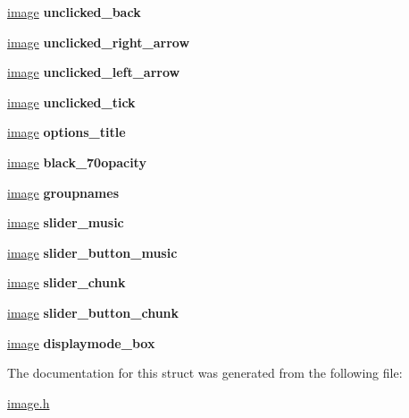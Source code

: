 \begin{DoxyCompactItemize}
\item 
\mbox{\label{structimage__bouton_a9f50c99a41d7c236a746d62a0832755e}} 
\hyperlink{structimage}{image} {\bfseries unclicked\+\_\+back}
\item 
\mbox{\label{structimage__bouton_a61caa4439115ba0d8e9826125d0419cb}} 
\hyperlink{structimage}{image} {\bfseries unclicked\+\_\+right\+\_\+arrow}
\item 
\mbox{\label{structimage__bouton_a962f5223309deb3313795c506ada8310}} 
\hyperlink{structimage}{image} {\bfseries unclicked\+\_\+left\+\_\+arrow}
\item 
\mbox{\label{structimage__bouton_a7bb593d9f6dc16baa076690bc118c000}} 
\hyperlink{structimage}{image} {\bfseries unclicked\+\_\+tick}
\item 
\mbox{\label{structimage__bouton_aeb837c5dc2844d23f583adc56f6dd5c0}} 
\hyperlink{structimage}{image} {\bfseries options\+\_\+title}
\item 
\mbox{\label{structimage__bouton_a7caa5d13adab64395be26b2861f4c6f4}} 
\hyperlink{structimage}{image} {\bfseries black\+\_\+70opacity}
\item 
\mbox{\label{structimage__bouton_a6d631e8a430463530b54f6397a8043ad}} 
\hyperlink{structimage}{image} {\bfseries groupnames}
\item 
\mbox{\label{structimage__bouton_a30f5dfb2292d415d79878c73fb2a8857}} 
\hyperlink{structimage}{image} {\bfseries slider\+\_\+music}
\item 
\mbox{\label{structimage__bouton_a6073d96eca292b533a3ebdceb3420d82}} 
\hyperlink{structimage}{image} {\bfseries slider\+\_\+button\+\_\+music}
\item 
\mbox{\label{structimage__bouton_aee0494a9ba168d40eaba7533872c18ce}} 
\hyperlink{structimage}{image} {\bfseries slider\+\_\+chunk}
\item 
\mbox{\label{structimage__bouton_ae38c3449ada80dfbea8fe851873ea1c3}} 
\hyperlink{structimage}{image} {\bfseries slider\+\_\+button\+\_\+chunk}
\item 
\mbox{\label{structimage__bouton_a937aba6b5e42ca10fbe800ef72e89462}} 
\hyperlink{structimage}{image} {\bfseries displaymode\+\_\+box}
\end{DoxyCompactItemize}


The documentation for this struct was generated from the following file\+:\begin{DoxyCompactItemize}
\item 
\hyperlink{image_8h}{image.\+h}\end{DoxyCompactItemize}
